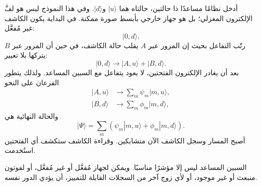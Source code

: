أدخل نظامًا مساعدًا ذا حالتين، حالتاه هما \(|u\rangle\) و\(|d\rangle\). وفي هذا النموذج ليس هو لفَّ الإلكترون المغزلي؛ بل هو جهاز خارجي بأبسط صورة ممكنة. في البداية يكون الكاشف غير مُفعَّل:
\begin{equation}
|0,d\rangle.
\end{equation}
رتّب التفاعل بحيث إن المرور عبر \(A\) يقلب حالة الكاشف، في حين أن المرور عبر \(B\) يتركها بلا تغيير:
\begin{equation}
|0,d\rangle
\longrightarrow
|A,u\rangle+|B,d\rangle.
\end{equation}
بعد أن يغادر الإلكترون الفتحتين، لا يعود يتفاعل مع السبين المساعد. ولذلك يتطور الفرعان على النحو
\begin{align}
|A,u\rangle &\longrightarrow \sum_m\psi_m|m,u\rangle, \\
|B,d\rangle &\longrightarrow \sum_m\phi_m|m,d\rangle,
\end{align}
والحالة النهائية هي
\begin{equation}
|\Psi\rangle
=\sum_m\left(\psi_m|m,u\rangle+\phi_m|m,d\rangle\right).
\end{equation}
أصبح المسار وسجل الكاشف الآن متشابكين. وقراءة الكاشف ستكشف أي الفتحتين استُخدمت.

\begin{classroomqa}
\end{classroomqa}

السبين المساعد ليس إلا مؤشرًا مناسبًا. ويمكن لجهاز مُفعَّل أو غير مُفعَّل، أو لفوتون منبعث أو غير موجود، أو لأي زوج آخر من السجلات القابلة للتمييز، أن يؤدي الدور نفسه.

\begin{classroomqa}
\end{classroomqa}

